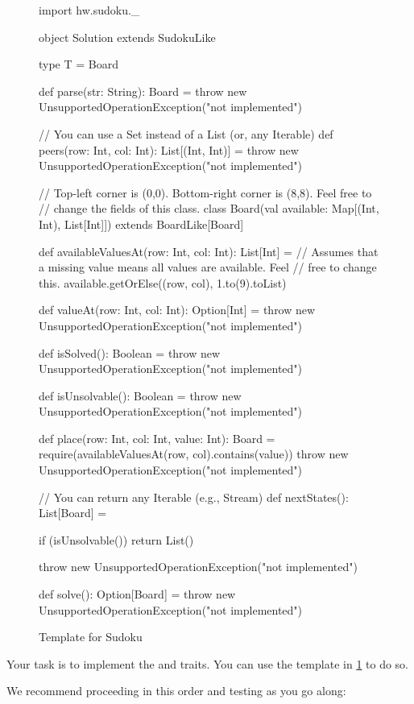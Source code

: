 \documentclass{book}
\begin{document}
\begin{figure}
\begin{scalacode}
import hw.sudoku._

object Solution extends SudokuLike {
  type T = Board

  def parse(str: String): Board = {
    throw new UnsupportedOperationException("not implemented")
  }

  // You can use a Set instead of a List (or, any Iterable)
  def peers(row: Int, col: Int): List[(Int, Int)] = {
    throw new UnsupportedOperationException("not implemented")
  }
}

// Top-left corner is (0,0). Bottom-right corner is (8,8). Feel free to
// change the fields of this class.
class Board(val available: Map[(Int, Int), List[Int]]) extends BoardLike[Board] {

  def availableValuesAt(row: Int, col: Int): List[Int] = {
    // Assumes that a missing value means all values are available. Feel
    // free to change this.
    available.getOrElse((row, col), 1.to(9).toList)
  }

  def valueAt(row: Int, col: Int): Option[Int] = {
    throw new UnsupportedOperationException("not implemented")
  }

  def isSolved(): Boolean = {
    throw new UnsupportedOperationException("not implemented")
  }

  def isUnsolvable(): Boolean = {
    throw new UnsupportedOperationException("not implemented")
  }

  def place(row: Int, col: Int, value: Int): Board = {
    require(availableValuesAt(row, col).contains(value))
    throw new UnsupportedOperationException("not implemented")
  }

  // You can return any Iterable (e.g., Stream)
  def nextStates(): List[Board] = {
    if (isUnsolvable()) {
      return List()
    }

    throw new UnsupportedOperationException("not implemented")
  }

  def solve(): Option[Board] = {
    throw new UnsupportedOperationException("not implemented")
  }
}
\end{scalacode}
\caption{Template for Sudoku}\label{sudokutemplate}
\end{figure}


Your task is to implement the  and
 traits. You can use the template in
\cref{sudokutemplate} to do so.

We recommend proceeding in this order and testing as you go along:
\end{document}
